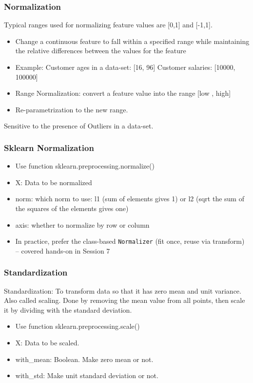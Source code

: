 \begin{frame}[fragile]\frametitle{Normalization}	
Typical ranges used for normalizing feature values are [0,1] and [-1,1].

\begin{itemize}
\item Change a continuous feature to fall within a specified range while maintaining the relative differences between the values for the feature
\item Example:
Customer ages in a data-set: [16, 96]
Customer salaries: [10000, 100000]
\item Range Normalization: convert a feature value into the range [low , high] 
\item Re-parametrization to the new range.
\end{itemize}
Sensitive to the presence of Outliers in a data-set.
\end{frame}

\begin{frame}[fragile]\frametitle{Sklearn Normalization}
	\begin{itemize}
	\item Use function sklearn.preprocessing.normalize()
	\item  X: Data to be normalized
	\item norm: which norm to use: l1 (sum of elements gives 1) or l2 (sqrt the sum of the squares of the elements gives one)
	\item axis: whether to normalize by row or column
	\item In practice, prefer the class-based \texttt{Normalizer} (fit once, reuse via transform) -- covered hands-on in Session 7
	\end{itemize}
\end{frame}






\begin{frame}[fragile]\frametitle{Standardization}
Standardization: To transform data so that it has zero mean and unit variance. Also called scaling.
Done by removing the mean value from all points, then scale it by dividing with the standard deviation.
	\begin{itemize}
	\item Use function sklearn.preprocessing.scale()
	\item  X: Data to be scaled.
	\item with\_mean: Boolean. Make zero mean or not.
	\item with\_std: Make unit standard deviation or not.
	\end{itemize}
\end{frame}



